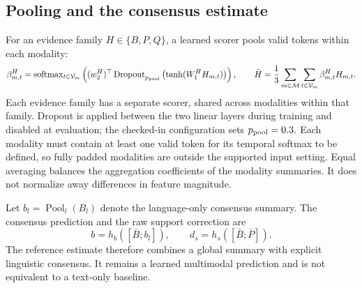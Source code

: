 \documentclass[review,12pt]{elsarticle}
\newcommand{\pool}{\operatorname{Pool}}
\begin{document}
\subsection{Pooling and the consensus estimate}
For an evidence family $H\in\{B,P,Q\}$, a learned scorer pools valid tokens within each modality:
\begin{equation}
\beta^H_{m,t}=\operatorname{softmax}_{t\in\mathcal V_m}
\left((w_2^H)^\top\operatorname{Dropout}_{p_{\rm pool}}
\left(\tanh(W_1^H H_{m,t})\right)\right),\qquad
\bar H=\frac13\sum_{m\in\mathcal M}\sum_{t\in\mathcal V_m}\beta^H_{m,t}H_{m,t}.
\label{eq:pool}
\end{equation}
Each evidence family has a separate scorer, shared across modalities within that family. Dropout is applied between the two linear layers during training and disabled at evaluation; the checked-in configuration sets $p_{\rm pool}=0.3$. Each modality must contain at least one valid token for its temporal softmax to be defined, so fully padded modalities are outside the supported input setting. Equal averaging balances the aggregation coefficients of the modality summaries. It does not normalize away differences in feature magnitude.

Let $b_l=\pool_l(B_l)$ denote the language-only consensus summary. The consensus prediction and the raw support correction are
\begin{equation}
b=h_b([\bar B;b_l]),\qquad d_s=h_s([\bar B;\bar P]).
\label{eq:base_support}
\end{equation}
The reference estimate therefore combines a global summary with explicit linguistic consensus. It remains a learned multimodal prediction and is not equivalent to a text-only baseline.
\end{document}
